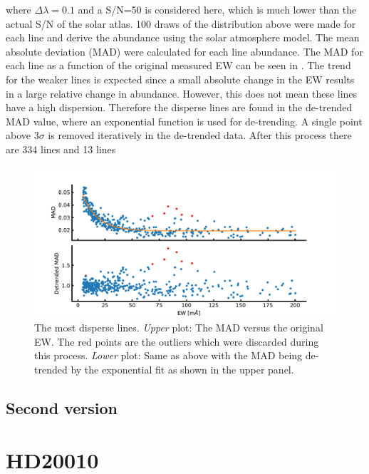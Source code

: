 where $\Delta\lambda=0.1$ and a S/N=50 is considered here, which is much lower than the actual S/N
of the solar atlas. 100 draws of the distribution above were made for each line and derive the
abundance using the solar atmosphere model. The mean absolute deviation (MAD) were calculated for
each line abundance. The MAD for each line as a function of the original measured EW can be seen in
. The trend for the weaker lines is expected since a small absolute
change in the EW results in a large relative change in abundance. However, this does not mean these
lines have a high dispersion. Therefore the disperse lines are found in the de-trended MAD value,
where an exponential function is used for de-trending. A single point above $3\sigma$ is removed
iteratively in the de-trended data. After this process there are 334  lines and 13
 lines

\begin{figure}[htpb!]
    \centering
    \includegraphics[width=1.0\linewidth]{figures/disperse_lines.pdf}
    \caption{The most disperse lines. \emph{Upper} plot: The MAD versus the original EW. The red
             points are the outliers which were discarded during this process. \emph{Lower} plot:
             Same as above with the MAD being de-trended by the exponential fit as shown in the
             upper panel.}
    \label{fig:dispersive_lines}
\end{figure}



\subsection{Second version}





\section{HD20010}
\label{sec:HD20010}

